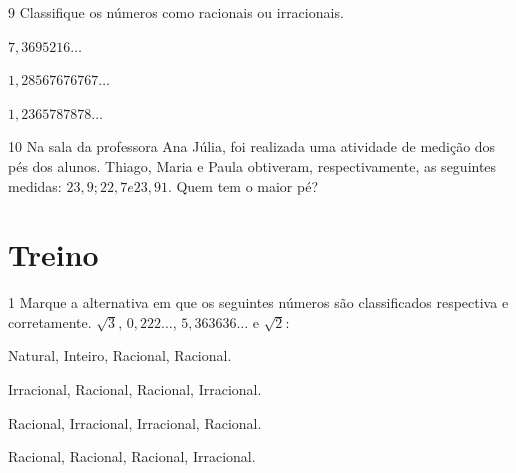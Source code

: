 

\num{9} Classifique os números como racionais ou irracionais.

\begin{escolha}
    \item $7,3695216\ldots{}$

    \item $1,28567676767\ldots{}$
    
    \item $1,2365787878\ldots{}$
\end{escolha}

\num{10} Na sala da professora Ana Júlia, foi realizada uma atividade de
medição dos pés dos alunos. Thiago, Maria e Paula obtiveram,
respectivamente, as seguintes medidas: $23,9; 22,7 e 23,91$. Quem tem o
maior pé?


\section{Treino}

\num{1} Marque a alternativa em que os seguintes números são classificados
respectiva e corretamente. $\sqrt{3}$, $0,222\ldots{}$, $5,363636\ldots{}$ e $\sqrt{2}$:

\begin{escolha}
    
    \item Natural, Inteiro, Racional, Racional.
    
    \item Irracional, Racional, Racional, Irracional.
    
    \item Racional, Irracional, Irracional, Racional.
    
    \item Racional, Racional, Racional, Irracional.

\end{escolha}

